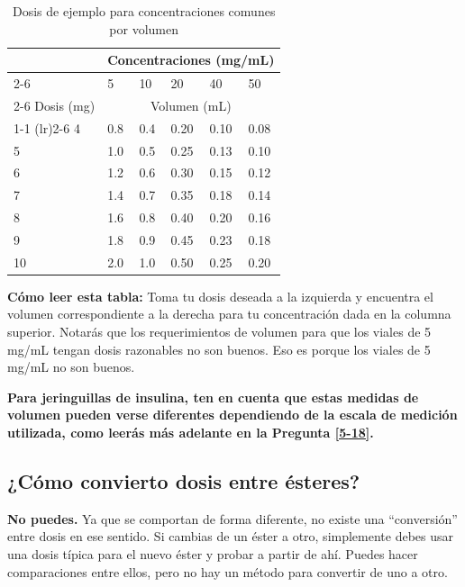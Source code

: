 \documentclass{article}
\begin{document}
\begin{table}
\centering
\caption{Dosis de ejemplo para concentraciones comunes por volumen}
\label{tab:concentrations}
\begin{tabular}{@{}llllll@{}}
  \toprule
  \multicolumn{1}{c}{} & \multicolumn{5}{c}{Concentraciones (mg/mL)} \\
  \cmidrule(rl){2-6}
            & 5    & 10  & 20 & 40 & 50   \\
            \cmidrule(rl){2-6}
Dosis (mg) & \multicolumn{5}{c}{Volumen (mL)}  \\
    \cmidrule(r){1-1} \cmidrule(lr){2-6}
4        & 0.8  & 0.4 & 0.20  & 0.10 & 0.08\\
5        & 1.0    & 0.5 & 0.25 & 0.13 &  0.10\\
6        & 1.2  & 0.6   & 0.30  & 0.15 & 0.12   \\
7        & 1.4  & 0.7 & 0.35  & 0.18 & 0.14\\
8        & 1.6  & 0.8   & 0.40  & 0.20 & 0.16  \\
9        & 1.8  & 0.9 & 0.45  & 0.23 & 0.18\\
10       & 2.0    & 1.0   & 0.50  & 0.25 & 0.20 \\
  \bottomrule
\end{tabular}
\end{table}

\textbf{Cómo leer esta tabla:} Toma tu dosis deseada a la izquierda y encuentra el volumen correspondiente a la derecha para tu concentración dada en la columna superior. Notarás que los requerimientos de volumen para que los viales de 5 mg/mL tengan dosis razonables no son buenos. Eso es porque los viales de 5 mg/mL no son buenos.

\textbf{Para jeringuillas de insulina, ten en cuenta que estas medidas de volumen pueden verse diferentes dependiendo de la escala de medición utilizada, como leerás más adelante en la Pregunta \ref{5-18}.}

\subsection{¿Cómo convierto dosis entre ésteres?}

\textbf{No puedes.} Ya que se comportan de forma diferente, no existe una “conversión” entre dosis en ese sentido. Si cambias de un éster a otro, simplemente debes usar una dosis típica para el nuevo éster y probar a partir de ahí. Puedes hacer comparaciones entre ellos, pero no hay un método para convertir de uno a otro.
\end{document}
